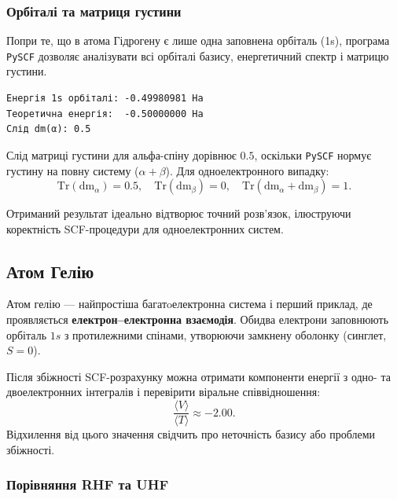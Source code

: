 \subsubsection{Орбіталі та матриця густини}

Попри те, що в атома Гідрогену є лише одна заповнена орбіталь (1s), програма \texttt{PySCF} дозволяє аналізувати всі орбіталі базису, енергетичний спектр і матрицю густини.


\begin{verbatim}
Енергія 1s орбіталі: -0.49980981 Ha
Теоретична енергія:  -0.50000000 Ha
Слід dm(α): 0.5
\end{verbatim}

Слід матриці густини для альфа-спіну дорівнює \(0.5\), оскільки \texttt{PySCF} нормує густину на повну систему (\(\alpha+\beta\)).
Для одноелектронного випадку:
\[
\mathrm{Tr}(\mathrm{dm}_\alpha) = 0.5, \quad \mathrm{Tr}(\mathrm{dm}_\beta) = 0, \quad
\mathrm{Tr}(\mathrm{dm}_\alpha + \mathrm{dm}_\beta) = 1.
\]

Отриманий результат ідеально відтворює точний розв'язок, ілюструючи коректність SCF-процедури для одноелектронних систем.

\subsection{Атом Гелію}

Атом гелію --- найпростіша багатoелектронна система і перший приклад, де проявляється \textbf{електрон–електронна взаємодія}.
Обидва електрони заповнюють орбіталь $1s$ з протилежними спінами, утворюючи замкнену оболонку (синглет, $S=0$).


Після збіжності SCF-розрахунку можна отримати компоненти енергії з одно- та двоелектронних інтегралів і перевірити віральне співвідношення:
\[
\frac{\langle V \rangle}{\langle T \rangle} \approx -2.00.
\]
Відхилення від цього значення свідчить про неточність базису або проблеми збіжності.

\subsubsection{Порівняння RHF та UHF}

